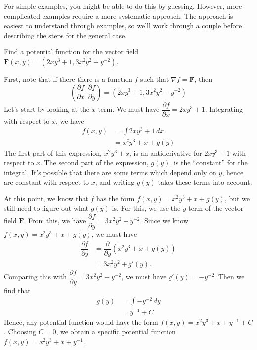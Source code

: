\documentclass{ximera}
\begin{document}
For simple examples, you might be able to do this by guessing. However, more complicated examples require a more systematic approach. The approach is easiest to understand through examples, so we'll work through a couple before describing the steps for the general case.

\begin{example}
Find a potential function for the vector field $\mathbf{F}(x,y)=(2xy^3+1,3x^2y^2-y^{-2})$.
\begin{explanation}
First, note that if there there is a function $f$ such that $\nabla f = \mathbf{F}$, then
\[
\left(\dfrac{\partial f}{\partial x}, \dfrac{\partial f}{\partial y}\right)=\left(2xy^3+1,3x^2y^2-y^{-2}\right)
\]
Let's start by looking at the $x$-term. We must have $\dfrac{\partial f}{\partial x} = 2xy^3+1$. Integrating with respect to $x$, we have
\begin{align*}
f(x,y) &= \int 2xy^3+1\,dx\\
&= x^2y^3+x+g(y)
\end{align*}
The first part of this expression, $x^2y^3+x$, is an antiderivative for $2xy^3+1$ with respect to $x$. The second part of the expression, $g(y)$, is the ``constant'' for the integral. It's possible that there are some terms which depend only on $y$, hence are constant with respect to $x$, and writing $g(y)$ takes these terms into account.

At this point, we know that $f$ has the form $f(x,y)=x^2y^3+x+g(y)$, but we still need to figure out what $g(y)$ is. For this, we use the $y$-term of the vector field $\mathbf{F}$. From this, we have $\dfrac{\partial f}{\partial y} = 3x^2y^2-y^{-2}$. Since we know $f(x,y)=x^2y^3+x+g(y)$, we must have
\begin{align*}
\dfrac{\partial f}{\partial y} &= \dfrac{\partial}{\partial y}\left(x^2y^3+x+g(y)\right)\\
&= 3x^2y^2+g'(y).
\end{align*}
Comparing this with $\dfrac{\partial f}{\partial y} = 3x^2y^2-y^{-2}$, we must have $g'(y) = -y^{-2}$. Then we find that 
\begin{align*}
g(y) &= \int -y^{-2}\,dy\\
&= y^{-1}+C
\end{align*}
Hence, any potential function would have the form $f(x,y)=x^2y^3+x+y^{-1}+C$. Choosing $C=0$, we obtain a specific potential function $f(x,y)=x^2y^3+x+y^{-1}$.
\end{explanation}
\end{example}
\end{document}
